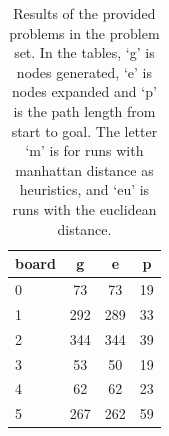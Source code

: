 \begin{table}[h]
\begin{minipage}{\textwidth}
\begin{minipage}{0.33\textwidth}
\begin{tabular}{l | c | c | c }
				board 		& g 		& e 		& p 	\\ \hline
				0 			& 73 		& 73 		& 19	\\
				1 			& 292		& 289		& 33	\\
				2 			& 344		& 344		& 39	\\
				3 			& 53		& 50		& 19	\\
				4 			& 62		& 62		& 23	\\
				5 			& 267		& 262		& 59	\\
			\end{tabular}
		\end{minipage}
	\end{minipage}
	\caption{Results of the provided problems in the problem set. In the tables, `g' is nodes generated, `e' is nodes expanded and `p' is the path length from start to goal. The letter `m' is for runs with manhattan distance as heuristics, and `eu' is runs with the euclidean distance.}
	\label{table:results}
\end{table}